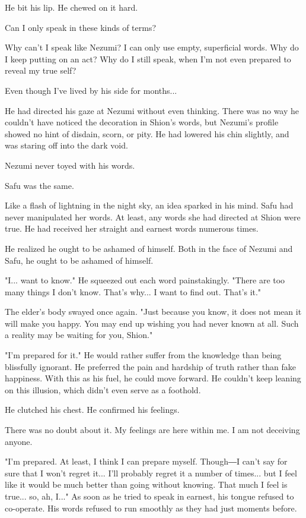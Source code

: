 He bit his lip. He chewed on it hard.

Can I only speak in these kinds of terms?

Why can't I speak like Nezumi? I can only use empty, superficial words.
Why do I keep putting on an act? Why do I still speak, when I'm not even
prepared to reveal my true self?

Even though I've lived by his side for months...

He had directed his gaze at Nezumi without even thinking. There was no
way he couldn't have noticed the decoration in Shion's words, but
Nezumi's profile showed no hint of disdain, scorn, or pity. He had
lowered his chin slightly, and was staring off into the dark void.

Nezumi never toyed with his words.

Safu was the same.

Like a flash of lightning in the night sky, an idea sparked in his mind.
Safu had never manipulated her words. At least, any words she had
directed at Shion were true. He had received her straight and earnest
words numerous times.

He realized he ought to be ashamed of himself. Both in the face of
Nezumi and Safu, he ought to be ashamed of himself.

"I... want to know." He squeezed out each word painstakingly. "There are
too many things I don't know. That's why... I want to find out. That's
it."

The elder's body swayed once again. "Just because you know, it does not
mean it will make you happy. You may end up wishing you had never known
at all. Such a reality may be waiting for you, Shion."

"I'm prepared for it." He would rather suffer from the knowledge than
being blissfully ignorant. He preferred the pain and hardship of truth
rather than fake happiness. With this as his fuel, he could move
forward. He couldn't keep leaning on this illusion, which didn't even
serve as a foothold.

He clutched his chest. He confirmed his feelings.

There was no doubt about it. My feelings are here within me. I am not
deceiving anyone.

"I'm prepared. At least, I think I can prepare myself. Though―I can't
say for sure that I won't regret it... I'll probably regret it a number
of times... but I feel like it would be much better than going without
knowing. That much I feel is true... so, ah, I..." As soon as he tried
to speak in earnest, his tongue refused to co-operate. His words refused
to run smoothly as they had just moments before.

